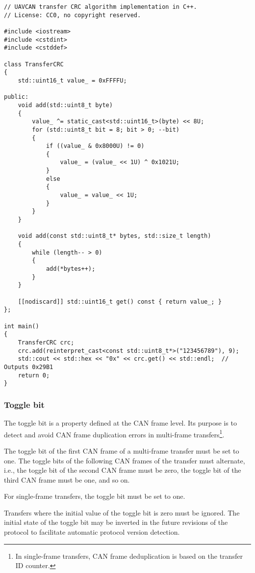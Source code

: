 \begin{minipage}{0.9\textwidth}
\begin{verbatim}
// UAVCAN transfer CRC algorithm implementation in C++.
// License: CC0, no copyright reserved.

#include <iostream>
#include <cstdint>
#include <cstddef>

class TransferCRC
{
    std::uint16_t value_ = 0xFFFFU;

public:
    void add(std::uint8_t byte)
    {
        value_ ^= static_cast<std::uint16_t>(byte) << 8U;
        for (std::uint8_t bit = 8; bit > 0; --bit)
        {
            if ((value_ & 0x8000U) != 0)
            {
                value_ = (value_ << 1U) ^ 0x1021U;
            }
            else
            {
                value_ = value_ << 1U;
            }
        }
    }

    void add(const std::uint8_t* bytes, std::size_t length)
    {
        while (length-- > 0)
        {
            add(*bytes++);
        }
    }

    [[nodiscard]] std::uint16_t get() const { return value_; }
};

int main()
{
    TransferCRC crc;
    crc.add(reinterpret_cast<const std::uint8_t*>("123456789"), 9);
    std::cout << std::hex << "0x" << crc.get() << std::endl;  // Outputs 0x29B1
    return 0;
}
\end{verbatim}
\end{minipage}

\subsubsection{Toggle bit}\label{sec:toggle_bit}

The toggle bit is a property defined at the CAN frame level.
Its purpose is to detect and avoid CAN frame duplication errors in multi-frame
transfers\footnote{In single-frame transfers, CAN frame deduplication is based on the transfer ID counter.}.

The toggle bit of the first CAN frame of a multi-frame transfer must be set to one.
The toggle bits of the following CAN frames of the transfer must alternate,
i.e., the toggle bit of the second CAN frame must be zero,
the toggle bit of the third CAN frame must be one, and so on.

For single-frame transfers, the toggle bit must be set to one.

Transfers where the initial value of the toggle bit is zero must be ignored.
The initial state of the toggle bit may be inverted in the future revisions of the protocol
to facilitate automatic protocol version detection.

